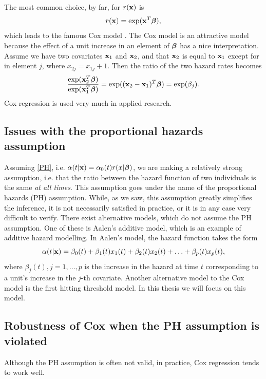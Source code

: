 The most common choice, by far, for $r(\mathbf{x})$ is
\begin{equation*}
    r(\mathbf{x})=\exp(\mathbf{x}^T\boldsymbol{\beta}),
\end{equation*}
which leads to the famous Cox model \citep{cox}. The Cox model is an attractive model because the effect of a unit increase in an element of $\boldsymbol{\beta}$ has a nice interpretation. Assume we have two covariates $\mathbf{x}_1$ and $\mathbf{x}_2$, and that $\mathbf{x}_2$ is equal to $\mathbf{x}_1$ except for in element $j$, where $x_{2j}=x_{1j}+1$. Then the ratio of the two hazard rates becomes
\begin{equation*}
    \frac{\exp(\mathbf{x}_2^T\boldsymbol{\beta})}{\exp(\mathbf{x}_1^T\boldsymbol{\beta})}=\exp((\mathbf{x}_2-\mathbf{x}_1)^T\boldsymbol{\beta})=\exp(\beta_j).
\end{equation*}
Cox regression is used very much in applied research.



\subsection{Issues with the proportional hazards assumption}
Assuming \eqref{PH}, i.e. $\alpha(t|\mathbf{x})=\alpha_0(t)r(x|\boldsymbol{\beta})$, we are making a relatively strong assumption, i.e. that the ratio between the hazard function of two individuals is the same \textit{at all times}. This assumption goes under the name of the proportional hazards (PH) assumption. While, as we saw, this assumption greatly simplifies the inference, it is not necessarily satisfied in practice, or it is in any case very difficult to verify. There exist alternative models, which do not assume the PH assumption. One of these is Aalen's additive model, which is an example of additive hazard modelling. In Aalen's model, the hazard function takes the form
\begin{equation}
    \alpha(t|\mathbf{x})=\beta_0(t)+\beta_1(t)x_1(t)+\beta_2(t)x_2(t)+\ldots+\beta_p(t)x_p(t),
\end{equation}
where $\beta_j(t),j=1,\ldots,p$ is the increase in the hazard at time $t$ corresponding to a unit's increase in the $j$-th covariate. Another alternative model to the Cox model is the first hitting threshold model. In this thesis we will focus on this model.

\subsection{Robustness of Cox when the PH assumption is violated}
Although the PH assumption is often not valid, in practice, Cox regression tends to work well. 

